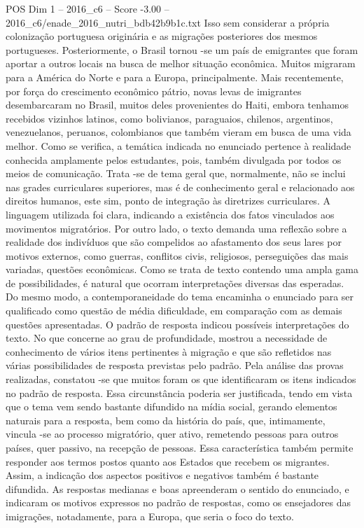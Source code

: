 \begin{textsample}{POS Dim 1 – 2016\_c6 – Score -3.00 – 2016\_c6/enade\_2016\_nutri\_bdb42b9b1c.txt}
Isso sem considerar a própria colonização portuguesa originária e as migrações posteriores dos mesmos portugueses.
Posteriormente, o Brasil tornou -se um país de emigrantes que foram aportar a outros locais na busca de melhor situação econômica.
Muitos migraram para a América do Norte e para a Europa, principalmente.
Mais recentemente, por força do crescimento econômico pátrio, novas levas de imigrantes desembarcaram no Brasil, muitos deles provenientes do Haiti, embora tenhamos recebidos vizinhos latinos, como bolivianos, paraguaios, chilenos, argentinos, venezuelanos, peruanos, colombianos que também vieram em busca de uma vida melhor.
Como se verifica, a temática indicada no enunciado pertence à realidade conhecida amplamente pelos estudantes, pois, também divulgada por todos os meios de comunicação.
Trata -se de tema geral que, normalmente, não se inclui nas grades curriculares superiores, mas é de conhecimento geral e relacionado aos direitos humanos, este sim, ponto de integração às diretrizes curriculares.
A linguagem utilizada foi clara, indicando a existência dos fatos vinculados aos movimentos migratórios.
Por outro lado, o texto demanda uma reflexão sobre a realidade dos indivíduos que são compelidos ao afastamento dos seus lares por motivos externos, como guerras, conflitos civis, religiosos, perseguições das mais variadas, questões econômicas.
Como se trata de texto contendo uma ampla gama de possibilidades, é natural que ocorram interpretações diversas das esperadas.
Do mesmo modo, a contemporaneidade do tema encaminha o enunciado para ser qualificado como questão de média dificuldade, em comparação com as demais questões apresentadas.
O padrão de resposta indicou possíveis interpretações do texto.
No que concerne ao grau de profundidade, mostrou a necessidade de conhecimento de vários itens pertinentes à migração e que são refletidos nas várias possibilidades de resposta previstas pelo padrão.
Pela análise das provas realizadas, constatou -se que muitos foram os que identificaram os itens indicados no padrão de resposta.
Essa circunstância poderia ser justificada, tendo em vista que o tema vem sendo bastante difundido na mídia social, gerando elementos naturais para a resposta, bem como da história do país, que, intimamente, vincula -se ao processo migratório, quer ativo, remetendo pessoas para outros países, quer passivo, na recepção de pessoas.
Essa característica também permite responder aos termos postos quanto aos Estados que recebem os migrantes.
Assim, a indicação dos aspectos positivos e negativos também é bastante difundida.
As respostas medianas e boas apreenderam o sentido do enunciado, e indicaram os motivos expressos no padrão de respostas, como os ensejadores das imigrações, notadamente, para a Europa, que seria o foco do texto.

\end{textsample}
